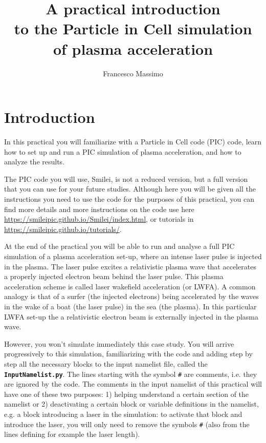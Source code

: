\documentclass[a4paper,12pt]{extarticle}
\title{\vspace{-2.cm}A practical introduction \\to the Particle in Cell simulation \\of plasma acceleration}
\author{Francesco Massimo}
\newcommand{\smilei}{{\sc Smilei}\xspace}
\newcommand{\commandline}[1]{\texttt{\textbf{#1}}}
\begin{document}
\maketitle

\tableofcontents

\section{Introduction} %
In this practical you will familiarize with a Particle in Cell code (PIC) code, learn how to set up and run a PIC simulation of plasma acceleration, and how to analyze the results.

The PIC code you will use, \smilei, is not a reduced version, but a full version that you can use for your future studies. Although here you will be given all the instructions you need to use the code for the purposes of this practical, you can find more details and more instructions on the code use here \url{https://smileipic.github.io/Smilei/index.html}, or tutorials in \url{https://smileipic.github.io/tutorials/}.

At the end of the practical you will be able to run and analyse a full PIC simulation of a plasma acceleration set-up, where an intense laser pulse is injected in the plasma. The laser pulse excites a relativistic plasma wave that accelerates a properly injected electron beam behind the laser pulse.  This plasma acceleration scheme is called laser wakefield acceleration (or LWFA).  A common analogy is that of a surfer (the injected electrons) being accelerated by the waves in the wake of a boat (the laser pulse) in the sea (the plasma).  In this particular LWFA set-up the a relativistic electron beam is externally injected in the plasma wave.

However, you won't simulate immediately this case study.  You will arrive progressively to this simulation, familiarizing with the code and adding step by step all the necessary blocks to the input namelist file, called the \commandline{InputNamelist.py}. The lines starting with the symbol \texttt{\#} are comments, i.e. they are ignored by the code. The comments in the input namelist of this practical will have one of these two purposes: 1) helping understand a certain section of the namelist or 2) deactivating a certain block or variable definitions in the namelist, e.g. a block introducing a laser in the simulation: to activate that block and introduce the laser, you will only need to remove the symbols \texttt{\#} (also from the lines defining for example the laser length).
\end{document}
